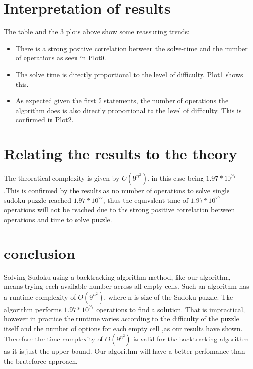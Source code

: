 \documentclass[11pt]{report}
\begin{document}
    \section{Interpretation of results}
        The table and the 3 plots above show some reassuring trends:\\
        \begin{itemize}
            \item There is a strong positive correlation between the solve-time and the number of operations as seen in Plot0.
            \item The solve time is directly proportional to the level of difficulty. Plot1 shows this.
            \item As expected given the first 2 statements, the number of operations the algorithm does is also directly proportional
             to the level of difficulty. This is confirmed in Plot2.
        \end{itemize}

    \section{Relating the results to the theory}
        The theoratical complexity is given by \(O(9^{n^2})\), in this case being \(1.97*10^{77}\).This is confirmed by
        the results as no number of operations to solve single sudoku puzzle reached \(1.97*10^{77}\), thus the
        equivalent time of \(1.97*10^{77}\) operations will not be reached due to the strong positive correlation
        between operations and time to solve puzzle.

    \section{conclusion}
        Solving Sudoku using a backtracking algorithm method, like our algorithm, means trying each
        available number across all empty cells. Such an algorithm has a runtime complexity of
        \(O(9^{n^2})\), where n is size of the Sudoku puzzle. The algorithm performs \(1.97*10^{77}\)
        operations to find a solution. That is impractical, however in practice the runtime varies according to
        the difficulty of the puzzle itself and the number of options for each empty cell ,as our results have shown. Therefore the time
        complexity of \(O(9^{n^2})\) is valid for the backtracking algorithm as it is just the upper bound. Our algorithm will have a 
        better perfomance than the bruteforce approach.             
\end{document}
